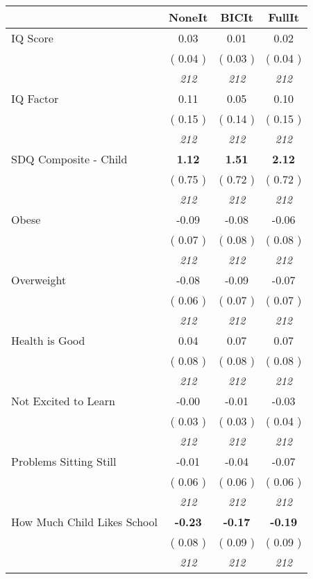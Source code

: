 \begin{tabular}{l c c c}
\toprule
 & NoneIt & BICIt & FullIt \\
\midrule
IQ Score &      0.03 &      0.01 &      0.02 \\
& (     0.04 ) & (     0.03 ) & (     0.04 ) \\
& \textit{ 212 } & \textit{ 212 } & \textit{ 212 } \\
IQ Factor &      0.11 &      0.05 &      0.10 \\
& (     0.15 ) & (     0.14 ) & (     0.15 ) \\
& \textit{ 212 } & \textit{ 212 } & \textit{ 212 } \\
SDQ Composite - Child & \textbf{      1.12 } & \textbf{      1.51 } & \textbf{      2.12 } \\
& (     0.75 ) & (     0.72 ) & (     0.72 ) \\
& \textit{ 212 } & \textit{ 212 } & \textit{ 212 } \\
Obese &     -0.09 &     -0.08 &     -0.06 \\
& (     0.07 ) & (     0.08 ) & (     0.08 ) \\
& \textit{ 212 } & \textit{ 212 } & \textit{ 212 } \\
Overweight &     -0.08 &     -0.09 &     -0.07 \\
& (     0.06 ) & (     0.07 ) & (     0.07 ) \\
& \textit{ 212 } & \textit{ 212 } & \textit{ 212 } \\
Health is Good &      0.04 &      0.07 &      0.07 \\
& (     0.08 ) & (     0.08 ) & (     0.08 ) \\
& \textit{ 212 } & \textit{ 212 } & \textit{ 212 } \\
Not Excited to Learn &     -0.00 &     -0.01 &     -0.03 \\
& (     0.03 ) & (     0.03 ) & (     0.04 ) \\
& \textit{ 212 } & \textit{ 212 } & \textit{ 212 } \\
Problems Sitting Still &     -0.01 &     -0.04 &     -0.07 \\
& (     0.06 ) & (     0.06 ) & (     0.06 ) \\
& \textit{ 212 } & \textit{ 212 } & \textit{ 212 } \\
How Much Child Likes School & \textbf{     -0.23 } & \textbf{     -0.17 } & \textbf{     -0.19 } \\
& (     0.08 ) & (     0.09 ) & (     0.09 ) \\
& \textit{ 212 } & \textit{ 212 } & \textit{ 212 } \\
\bottomrule
\end{tabular}
